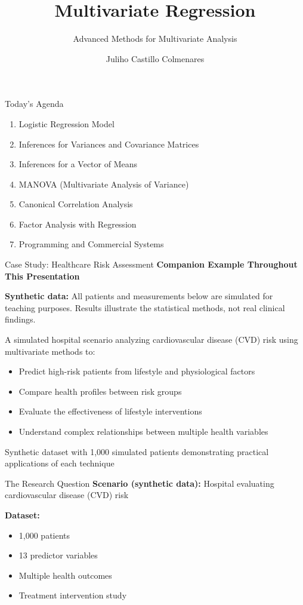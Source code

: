 \documentclass[aspectratio=169,ignorenonframetext]{beamer}
\title{\texorpdfstring{Multivariate
Regression}{Multivariate Regression}}
\author{\texorpdfstring{Juliho Castillo
Colmenares}{Juliho Castillo Colmenares}}
\subtitle{Advanced Methods for Multivariate Analysis}
\institute{Tec de Monterrey}
\date{}
\begin{document}
\frame{\titlepage}

\begin{frame}{Today's Agenda}
\begin{enumerate}
\item
  Logistic Regression Model
\item
  Inferences for Variances and Covariance Matrices
\item
  Inferences for a Vector of Means
\item
  MANOVA (Multivariate Analysis of Variance)
\item
  Canonical Correlation Analysis
\item
  Factor Analysis with Regression
\item
  Programming and Commercial Systems
\end{enumerate}
\end{frame}

\begin{frame}{Case Study: Healthcare Risk Assessment}
\textbf{Companion Example Throughout This Presentation}

\textbf{Synthetic data:} All patients and measurements below are
simulated for teaching purposes. Results illustrate the statistical
methods, not real clinical findings.

A simulated hospital scenario analyzing cardiovascular disease (CVD)
risk using multivariate methods to:

\begin{itemize}
\item
  Predict high-risk patients from lifestyle and physiological factors
\item
  Compare health profiles between risk groups
\item
  Evaluate the effectiveness of lifestyle interventions
\item
  Understand complex relationships between multiple health variables
\end{itemize}

Synthetic dataset with 1,000 simulated patients demonstrating practical
applications of each technique
\end{frame}

\begin{frame}{The Research Question}
\textbf{Scenario (synthetic data):} Hospital evaluating cardiovascular
disease (CVD) risk

\textbf{Dataset:}

\begin{itemize}
\item
  1,000 patients
\item
  13 predictor variables
\item
  Multiple health outcomes
\item
  Treatment intervention study
\end{itemize}
\end{frame}
\end{document}
